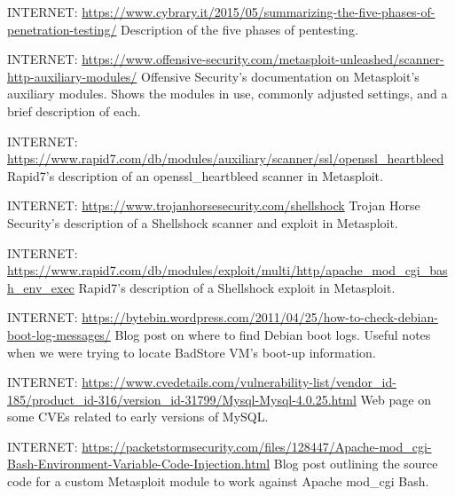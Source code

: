 \endnote{[26]}  INTERNET: \url{https://www.cybrary.it/2015/05/summarizing-the-five-phases-of-penetration-testing/}
Description of the five phases of pentesting.

\endnote{[27]}  INTERNET: \url{https://www.offensive-security.com/metasploit-unleashed/scanner-http-auxiliary-modules/}
Offensive Security's documentation on Metasploit's auxiliary modules.  Shows the modules in use, commonly adjusted settings, and a brief description of each.

\endnote{[28]}  INTERNET: \url{https://www.rapid7.com/db/modules/auxiliary/scanner/ssl/openssl_heartbleed}
Rapid7's description of an openssl\_heartbleed scanner in Metasploit.

\endnote{[29]}  INTERNET: \url{https://www.trojanhorsesecurity.com/shellshock}
Trojan Horse Security's description of a Shellshock scanner and exploit in Metasploit.

\endnote{[30]}  INTERNET: \url{https://www.rapid7.com/db/modules/exploit/multi/http/apache_mod_cgi_bash_env_exec}
Rapid7's description of a Shellshock \gls{exploit} in Metasploit.

\endnote{[31]}  INTERNET: \url{https://bytebin.wordpress.com/2011/04/25/how-to-check-debian-boot-log-messages/}
Blog post on where to find Debian boot logs.  Useful notes when we were trying to locate BadStore VM's boot-up information.

\endnote{[32]}  INTERNET: \url{https://www.cvedetails.com/vulnerability-list/vendor_id-185/product_id-316/version_id-31799/Mysql-Mysql-4.0.25.html}
Web page on some CVEs related to early versions of MySQL.

\endnote{[33]}  INTERNET: \url{https://packetstormsecurity.com/files/128447/Apache-mod_cgi-Bash-Environment-Variable-Code-Injection.html}
Blog post outlining the source code for a custom Metasploit module to work against Apache mod\_cgi Bash.

